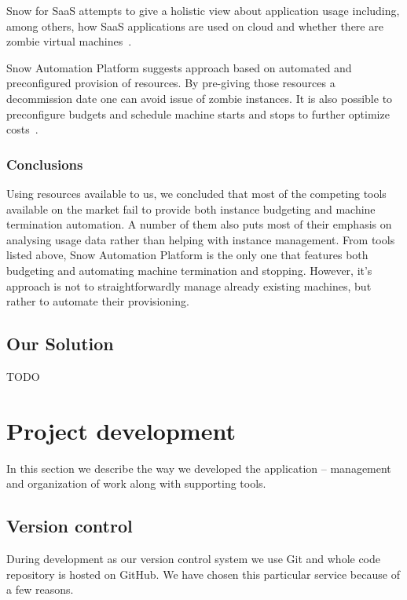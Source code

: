 \documentclass[licencjacka,en]{thesisclass}
\begin{document}
    Snow for SaaS attempts to give a holistic view about application usage including, among others,
    how SaaS applications are used on cloud and whether there are zombie virtual machines~\cite{SnowSaaS}.

    Snow Automation Platform suggests approach based on automated and preconfigured provision of resources.
    By pre-giving those resources a decommission date one can avoid issue of zombie instances.
    It is also possible to preconfigure budgets and schedule machine starts and stops to further optimize costs~\cite{SnowBlog}.

    \subsection{Conclusions}

    Using resources available to us, we concluded that most of the competing tools available on the market
    fail to provide both instance budgeting and machine termination automation.
    A number of them also puts most of their emphasis on analysing usage data rather than
    helping with instance management.
    From tools listed above, Snow Automation Platform is the only one that features both budgeting and automating
    machine termination and stopping.
    However, it's approach is not to straightforwardly manage already existing machines,
    but rather to automate their provisioning.

    \section{Our Solution}

    TODO



    \chapter{Project development}

    In this section we describe the way we developed the application -- management and organization of work along with supporting tools.

    \section{Version control}

    During development as our version control system we use Git and whole code repository is hosted on GitHub.
    We have chosen this particular service because of a few reasons.
\end{document}
